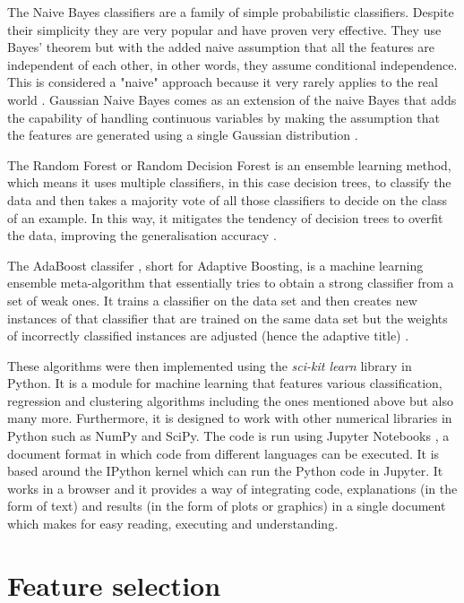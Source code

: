 The Naive Bayes classifiers are a family of simple probabilistic classifiers. Despite their simplicity they are very popular and have proven very effective. They use Bayes' theorem but with the added naive assumption that all the features are independent of each other, in other words, they assume conditional independence. This is considered a "naive" approach because it very rarely applies to the real world \cite{zhang2004optimality}. Gaussian Naive Bayes comes as an extension of the naive Bayes that adds the capability of handling continuous variables by making the assumption that the features are generated using a single Gaussian distribution \cite{john1995estimating} \cite{reiman2018predicting}.

The Random Forest or Random Decision Forest is an ensemble learning method, which means it uses multiple classifiers, in this case decision trees, to classify the data and then takes a majority vote of all those classifiers to decide on the class of an example. In this way, it mitigates the tendency of decision trees to overfit the data, improving the generalisation accuracy \cite{ho1995random}.

The AdaBoost classifer \cite{freund1997decision}, short for Adaptive Boosting, is a machine learning ensemble meta-algorithm that essentially tries to obtain a strong classifier from a set of weak ones. It trains a classifier on the data set and then creates new instances of that classifier that are trained on the same data set but the weights of incorrectly classified instances are adjusted (hence the adaptive title) \cite{sklearnadaboost:online}.

These algorithms were then implemented using the \textit{sci-kit learn} library \cite{pedregosa2011scikit} in Python. It is a module for machine learning that features various classification, regression and clustering algorithms including the ones mentioned above but also many more. Furthermore, it is designed to work with other numerical libraries in Python such as NumPy and SciPy. The code is run using Jupyter Notebooks \cite{kluyver2016jupyter}, a document format in which code from different languages can be executed. It is based around the IPython kernel which can run the Python code in Jupyter. It works in a browser and it provides a way of integrating code, explanations (in the form of text) and results (in the form of plots or graphics) in a single document which makes for easy reading, executing and understanding.

\section{Feature selection}

